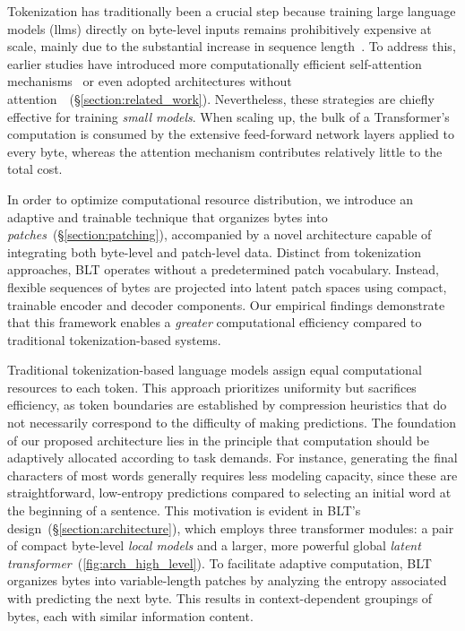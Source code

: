 Tokenization has traditionally been a crucial step because training large language models (llms) directly on byte-level inputs remains prohibitively expensive at scale, mainly due to the substantial increase in sequence length~\citep{xue2022byt5}. To address this, earlier studies have introduced more computationally efficient self-attention mechanisms~\citep{el2020characterbert, clark2022canine} or even adopted architectures without attention~\citep{wang2024mambabyte}~(\S\ref{section:related_work}). Nevertheless, these strategies are chiefly effective for training \textit{small models}. When scaling up, the bulk of a Transformer’s computation is consumed by the extensive feed-forward network layers applied to every byte, whereas the attention mechanism contributes relatively little to the total cost.

In order to optimize computational resource distribution, we introduce an adaptive and trainable technique that organizes bytes into \textit{patches}~(\S\ref{section:patching}), accompanied by a novel architecture capable of integrating both byte-level and patch-level data. Distinct from tokenization approaches, {\textsc BLT} operates without a predetermined patch vocabulary. Instead, flexible sequences of bytes are projected into latent patch spaces using compact, trainable encoder and decoder components. Our empirical findings demonstrate that this framework enables a \textit{greater} computational efficiency compared to traditional tokenization-based systems.

Traditional tokenization-based language models assign equal computational resources to each token. This approach prioritizes uniformity but sacrifices efficiency, as token boundaries are established by compression heuristics that do not necessarily correspond to the difficulty of making predictions. The foundation of our proposed architecture lies in the principle that computation should be adaptively allocated according to task demands. For instance, generating the final characters of most words generally requires less modeling capacity, since these are straightforward, low-entropy predictions compared to selecting an initial word at the beginning of a sentence. This motivation is evident in {\textsc BLT}'s design~(\S\ref{section:architecture}), which employs three transformer modules: a pair of compact byte-level \textit{local models} and a larger, more powerful global \textit{latent transformer}~(\autoref{fig:arch_high_level}). To facilitate adaptive computation, {\textsc BLT} organizes bytes into variable-length patches by analyzing the entropy associated with predicting the next byte. This results in context-dependent groupings of bytes, each with similar information content.

